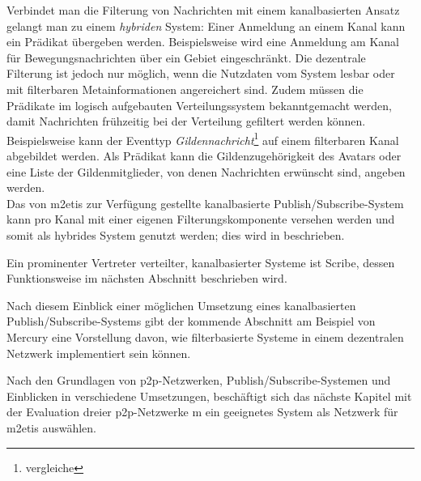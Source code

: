 Verbindet man die Filterung von Nachrichten mit einem kanalbasierten Ansatz gelangt man zu einem \emph{hybriden} System: Einer Anmeldung an einem Kanal kann ein Prädikat übergeben werden. Beispielsweise wird eine Anmeldung am Kanal für Bewegungsnachrichten über ein Gebiet eingeschränkt. Die dezentrale Filterung ist jedoch nur möglich, wenn die Nutzdaten vom System lesbar oder mit filterbaren Metainformationen angereichert sind. Zudem müssen die Prädikate im logisch aufgebauten Verteilungssystem bekanntgemacht werden, damit Nachrichten frühzeitig bei der Verteilung gefiltert werden können. Beispielsweise kann der Eventtyp \emph{Gildennachricht}\footnote{vergleiche } auf einem filterbaren Kanal abgebildet werden. Als Prädikat kann die Gildenzugehörigkeit des Avatars oder eine Liste der Gildenmitglieder, von denen Nachrichten erwünscht sind, angeben werden.\\
Das von \ac{m2etis} zur Verfügung gestellte kanalbasierte Publish/Subscribe-System kann pro Kanal mit einer eigenen Filterungskomponente versehen werden und somit als hybrides System genutzt werden; dies wird in  beschrieben.

Ein prominenter Vertreter verteilter, kanalbasierter Systeme ist Scribe, dessen Funktionsweise im nächsten Abschnitt beschrieben wird.



Nach diesem Einblick einer möglichen Umsetzung eines kanalbasierten Publish/Sub\-scribe-Systems gibt der kommende Abschnitt am Beispiel von Mercury eine Vorstellung davon, wie filterbasierte Systeme in einem dezentralen Netzwerk implementiert sein können.





Nach den Grundlagen von \ac{p2p}-Netzwerken, Publish/Subscribe-Systemen und Einblicken in verschiedene Umsetzungen, beschäftigt sich das nächste Kapitel mit der Evaluation dreier \ac{p2p}-Netzwerke m ein geeignetes System als Netzwerk für \ac{m2etis} auswählen.
